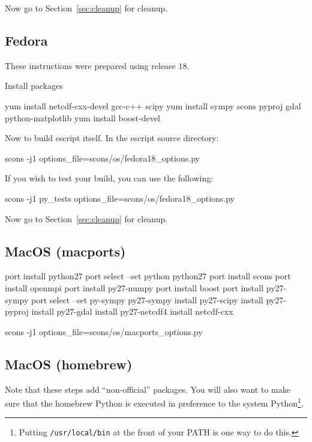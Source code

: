 \noindent Now go to Section~\ref{sec:cleanup} for cleanup.

\subsection{Fedora}\label{sec:fedorasrc}
These instructions were prepared using release $18$.

\noindent Install packages
\begin{shellCode}
yum install netcdf-cxx-devel gcc-c++ scipy 
yum install sympy scons pyproj gdal python-matplotlib 
yum install boost-devel
\end{shellCode}

\noindent Now to build escript itself.
In the escript source directory:
\begin{shellCode}
scons -j1 options_file=scons/os/fedora18_options.py
\end{shellCode}

\noindent If you wish to test your build, you can use the following:
\begin{shellCode}
scons -j1 py_tests options_file=scons/os/fedora18_options.py 
\end{shellCode}

\noindent Now go to Section~\ref{sec:cleanup} for cleanup.

\subsection{MacOS (macports)}\label{sec:macportsrc}

\begin{shellCode}
port install python27
port select --set python python27
port install scons
port install openmpi
port install py27-numpy
port install boost
port install py27-sympy
port select --set py-sympy py27-sympy
install py27-scipy
install py27-pyproj
install py27-gdal
install py27-netcdf4
install netcdf-cxx
\end{shellCode}

\begin{shellCode}
scons -j1 options_file=scons/os/macports_options.py 
\end{shellCode}


\subsection{MacOS (homebrew)}\label{sec:homebrewsrc}

Note that these steps add ``non-official'' packages.
You will also want to make sure that the homebrew Python is executed in preference to the system 
Python\footnote{Putting \texttt{/usr/local/bin} at the front of your PATH is one way to do this.}.

